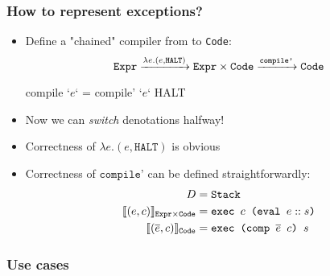 \documentclass[usenames,dvipsnames]{beamer}
\newcommand{\denot}[2][]{\llbracket #2 \rrbracket_{#1}}
\begin{document}

\begin{frame}[fragile]
  \frametitle{How to represent exceptions?}

  \begin{itemize}
    \item Define a "chained" compiler from \Expr{} to \texttt{Code}:
      \begin{equation*}
        \texttt{Expr}
          \xrightarrow{\lambda e . (e , \texttt{HALT})}
        \texttt{Expr} \times \texttt{Code}
          \xrightarrow{\texttt{compile'}}
        \texttt{Code}
      \end{equation*}
      \begin{code}
                  compile `$e$` = compile' `$e$` HALT
      \end{code}

    \item Now we can \emph{switch} denotations halfway!

    \item Correctness of $\lambda e . (e , \texttt{HALT})$ is obvious

    \item Correctness of $\texttt{compile'}$ can be defined straightforwardly:
      \begin{align*}
        D &= \texttt{Stack} \\
        \denot[\Expr \times \texttt{Code}]{(e,c)} &=
          \texttt{exec }c\texttt{ (eval $e :: s$)} \\
        \denot[\texttt{Code}]{(\overline{e},c)} &=
          \texttt{exec (comp $\overline{e}$ $c$) $s$}
      \end{align*}
  \end{itemize}
\end{frame}


\begin{frame}[fragile]
  \frametitle{Use cases}
\end{frame}
\end{document}
